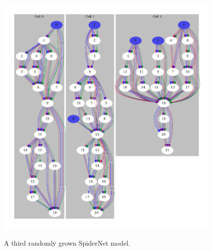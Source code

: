 \begin{figure}[ht]
    \centering
	\includegraphics[width=\linewidth, trim={0 1cm 0 1cm}, clip]{random-2-3} \\
        \caption[A third randomly grown SpiderNet model]{A third randomly grown SpiderNet model.}
    \label{fig:spider_rand2_example}
\end{figure}